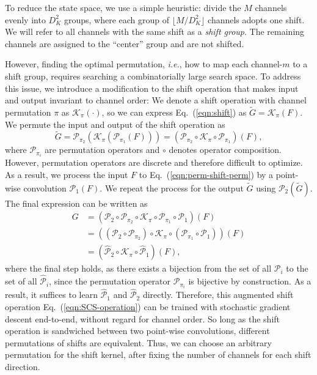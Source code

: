 \documentclass[10pt,twocolumn,letterpaper]{article}
\begin{document}
To reduce the state space, we use a simple heuristic: divide the $M$ channels evenly into $D_K^2$ groups, where each group of $\lfloor M/D_K^2 \rfloor$ channels adopts one shift. We will refer to all channels with the same shift as a \textit{shift group}. The remaining channels are assigned to the ``center'' group and are not shifted.

However, finding the optimal permutation, \textit{i.e.}, how to map each channel-$m$ to a shift group, requires searching a combinatorially large search space. To address this issue, we introduce a modification to the shift operation that makes input and output invariant to channel order: We denote a shift operation with channel permutation $\pi$ as $\mathcal{K}_{\pi}(\cdot)$, so we can express Eq.~(\ref{eqn:shift}) as $\tilde{G} = \mathcal{K}_{\pi}(F)$. We permute the input and output of the shift operation as  
\begin{equation}
\tilde{G} = \mathcal{P}_{\pi_2}(\mathcal{K}_{\pi}(\mathcal{P}_{\pi_1}(F))) = (\mathcal{P}_{\pi_2}\circ \mathcal{K}_{\pi} \circ \mathcal{P}_{\pi_1}) (F),
\label{eqn:perm-shift-perm}
\end{equation}
where $\mathcal{P}_{\pi_i}$ are permutation operators and $\circ$ denotes operator composition. However, permutation operators are discrete and therefore difficult to optimize. As a result, we process the input $F$ to Eq.~(\ref{eqn:perm-shift-perm}) by a point-wise convolution $\mathcal{P}_1 (F)$. We repeat the process for the output $\tilde{G}$ using $\mathcal{P}_2 (\tilde{G})$. The final expression can be written as 
\begin{equation}
\begin{aligned}
    G & = (\mathcal{P}_2 \circ \mathcal{P}_{\pi_2} \circ \mathcal{K}_{\pi} \circ \mathcal{P}_{\pi_1} \circ \mathcal{P}_1 ) (F) \\
    & = ((\mathcal{P}_2 \circ \mathcal{P}_{\pi_2}) \circ \mathcal{K}_{\pi} \circ (\mathcal{P}_{\pi_1} \circ \mathcal{P}_1) ) (F) \\ 
    & = (\hat{\mathcal{P}}_2 \circ \mathcal{K}_{\pi} \circ \hat{\mathcal{P}}_1) (F), 
\end{aligned}
\label{eqn:SCS-operation}
\end{equation}
where the final step holds, as there exists a bijection from the set of all $\mathcal{P}_i$ to the set of all $\mathcal{\hat{P}}_i$, since the permutation operator $\mathcal{P}_{\pi_i}$ is bijective by construction. As a result, it suffices to learn $\hat{\mathcal{P}}_1$ and $\hat{\mathcal{P}}_2$ directly. Therefore, this augmented shift operation Eq.~(\ref{eqn:SCS-operation}) can be trained with stochastic gradient descent end-to-end, without regard for channel order. So long as the shift operation is sandwiched between two point-wise convolutions, different permutations of shifts are equivalent. Thus, we can choose an arbitrary permutation for the shift kernel, after fixing the number of channels for each shift direction.
\end{document}
